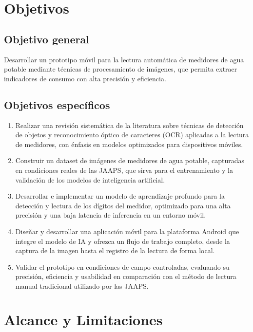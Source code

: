 \section{Objetivos}
\label{sec:objectives}

\subsection{Objetivo general}
\label{ssec:general_objective}

Desarrollar un prototipo móvil para la lectura automática de medidores de agua potable mediante técnicas de procesamiento de imágenes, que permita extraer indicadores de consumo con alta precisión y eficiencia.

\subsection{Objetivos específicos}
\label{ssec:specific_objectives}

\begin{enumerate}
\item Realizar una revisión sistemática de la literatura sobre técnicas de detección de objetos y reconocimiento óptico de caracteres (OCR) aplicadas a la lectura de medidores, con énfasis en modelos optimizados para dispositivos móviles.
\item Construir un dataset de imágenes de medidores de agua potable, capturadas en condiciones reales de las JAAPS, que sirva para el entrenamiento y la validación de los modelos de inteligencia artificial.
\item Desarrollar e implementar un modelo de aprendizaje profundo para la detección y lectura de los dígitos del medidor, optimizado para una alta precisión y una baja latencia de inferencia en un entorno móvil.
\item Diseñar y desarrollar una aplicación móvil para la plataforma Android que integre el modelo de IA y ofrezca un flujo de trabajo completo, desde la captura de la imagen hasta el registro de la lectura de forma local.
\item Validar el prototipo en condiciones de campo controladas, evaluando su precisión, eficiencia y usabilidad en comparación con el método de lectura manual tradicional utilizado por las JAAPS.
\end{enumerate}

\section{Alcance y Limitaciones}
\label{sec:scope_limitations}

